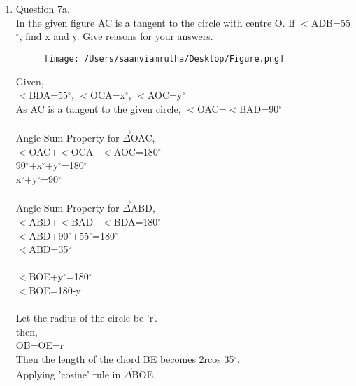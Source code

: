 \documentclass[journal,12pt,twocolumn]{IEEEtran}
\renewcommand\thesection{\arabic{section}}
\begin{document}
\section{}
\begin{enumerate}[label=\thesection.\arabic*.,ref=\thesection.\theenumi]

\item Question 7a.\\ In the given figure AC is a tangent to the circle with centre O. If $<$ADB=55$^{\circ}$, find x and y. Give reasons for your answers.\\
\begin{figure}[htbp]
\texttt{[image: /Users/saanviamrutha/Desktop/Figure.png]}
\label{fig}
\end{figure}

\solution 
Given,\\
 $<$BDA=55$^{\circ}$, $<$OCA=x$^{\circ}$, $<$AOC=y$^{\circ}$\\

As AC is a tangent to the given circle, $<$OAC=$<$BAD=90$^{\circ}$\\
\\
Angle Sum Property for $\vec{\Delta}$OAC, \\
               $<$OAC+$<$OCA+$<$AOC=180$^{\circ}$\\
               90$^{\circ}$+x$^{\circ}$+y$^{\circ}$=180$^{\circ}$\\
               x$^{\circ}$+y$^{\circ}$=90$^{\circ}$\\
               \\ 
Angle Sum Property for $\vec{\Delta}$ABD, \\   
               $<$ABD+$<$BAD+$<$BDA=180$^{\circ}$\\
               $<$ABD+90$^{\circ}$+55$^{\circ}$=180$^{\circ}$\\
               $<$ABD=35$^{\circ}$\\ \\
                
                $<$BOE+y$^{\circ}$=180$^{\circ}$\\
                $<$BOE=180-y\\ \\
                Let the radius of the circle be 'r'.\\
                then,\\
                OB=OE=r\\
                Then the length of the chord BE becomes 2rcos 35$^{\circ}$.\\
                Applying 'cosine' rule in $\vec{\Delta}$BOE,\\ 
              

\end{enumerate}
\end{document}

